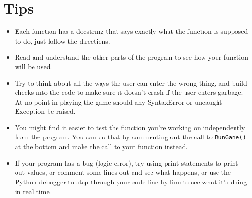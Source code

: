 \documentclass[11pt]{amsart}
\begin{document}
\section*{Tips}
\begin{itemize}
  \item Each function has a docstring that says exactly what the function is supposed to do, just follow the directions.
  \item Read and understand the other parts of the program to see how your function will be used.
  \item Try to think about all the ways the user can enter the wrong thing, and build checks into the code to make sure it doesn't crash if the user enters garbage. At no point in playing the game should any SyntaxError or uncaught Exception be raised.
  \item You might find it easier to test the function you're working on independently from the program. You can do that by commenting out the call to \texttt{RunGame()} at the bottom and make the call to your function instead.
  \item If your program has a bug (logic error), try using print statements to print out values, or comment some lines out and see what happens, or use the Python debugger to step through your code line by line to see what it's doing in real time.
\end{itemize}
\end{document}
